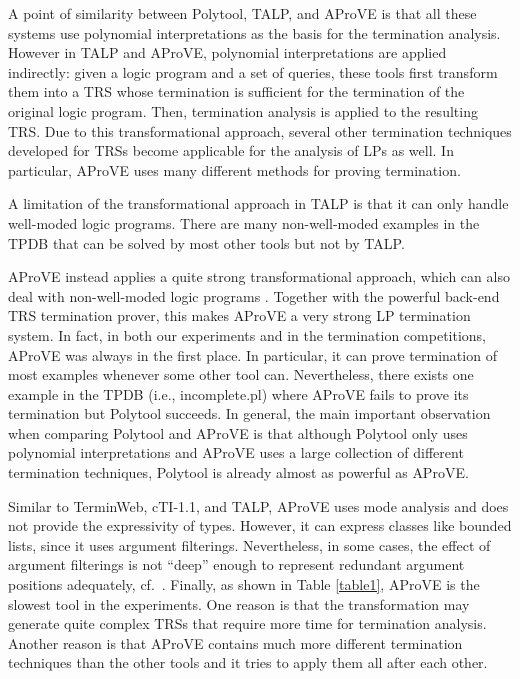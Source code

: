 \documentclass[envcountsame]{tlp}
\newcounter{ex:der-lastsymconsctr}
\begin{document}
A
point of similarity between \textsf{Polytool}, \textsf{TALP}, and \textsf{AProVE} is
that all these systems use polynomial interpretations as the  basis for the termination
analysis. 
However in \textsf{TALP} and \textsf{AProVE}, polynomial interpretations are
applied indirectly: given a 
logic program and a set of queries, these tools first transform them into a TRS
whose termination is sufficient for the termination of the original logic
program.
Then, termination analysis is applied to
the resulting TRS. Due to this transformational approach, 
several  other termination techniques developed for TRSs
become applicable for the analysis of LPs as well. In particular, \textsf{AProVE} uses
many different methods for proving
termination.

A limitation of the transformational approach in \textsf{TALP} is that it can
only handle well-moded
logic programs.
There are many non-well-moded examples in the TPDB that can
be solved by most other tools but not by \textsf{TALP}.

 \textsf{AProVE} instead applies a
quite strong transformational approach, which can also deal with non-well-moded logic
programs \cite{LOPSTR06}. Together with the powerful back-end TRS
termination prover, this makes \textsf{AProVE} a very strong LP termination system. In fact, in
both our experiments and in the termination competitions,
\textsf{AProVE} was always in the first place. In particular, it can prove
termination of most examples whenever some other tool can. Nevertheless, there exists 
one example in the TPDB (i.e., \textsf{incomplete.pl}) where
{\sf AProVE} fails to prove its termination but {\sf Polytool}
succeeds. In general, the main important observation when comparing {\sf
Polytool} and {\sf AProVE} is that although \textsf{Polytool} only
uses polynomial interpretations and {\sf AProVE} uses a large collection of
different termination techniques, {\sf Polytool} is already almost as powerful
as {\sf AProVE}. 







Similar to 
\textsf{TerminWeb}, \textsf{cTI-1.1}, and \textsf{TALP}, \textsf{AProVE} uses
mode analysis and does not provide the expressivity of types. However, it can
express classes like bounded lists, since it uses
argument filterings.
Nevertheless, in some cases,
the effect of argument filterings is not ``deep'' enough to represent
redundant argument positions adequately, cf.\ \cite{ThangThesis}.
Finally, as shown in Table \ref{table1}, \textsf{AProVE} is 
the slowest tool in the experiments. One reason is that
the transformation may generate quite complex TRSs that require more time for
termination analysis. Another reason is that \textsf{AProVE} contains much
more different termination techniques than the other tools and it tries to
apply them all after each other.
\end{document}
